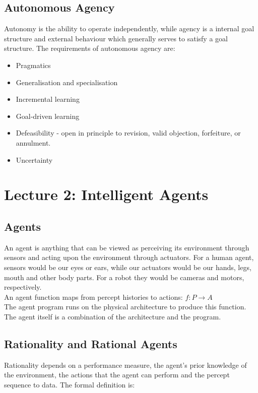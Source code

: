 \documentclass[11pt, oneside]{article}   	%
\begin{document}
\subsection{Autonomous Agency}
Autonomy is the ability to operate independently, while agency is a internal goal structure and external behaviour which generally serves to satisfy a goal structure. The requirements of autonomous agency are:
\begin{itemize}
\item Pragmatics
\item Generalisation and specialisation
\item Incremental learning
\item Goal-driven learning
\item Defeasibility - open in principle to revision, valid objection, forfeiture, or annulment.
\item Uncertainty
\end{itemize}

\section{Lecture 2: Intelligent Agents}

\subsection{Agents}

An agent is anything that can be viewed as perceiving its environment through sensors and acting upon the environment through actuators. For a human agent, sensors would be our eyes or ears, while our actuators would be our hands, legs, mouth and other body parts. For a robot they would be cameras and motors, respectively.
\\
An agent function maps from percept histories to actions: $f: P \rightarrow A$\\
The agent program runs on the physical architecture to produce this function.\\
The agent itself is a combination of the architecture and the program.\\

\subsection{Rationality and Rational Agents}

Rationality depends on a performance measure, the agent's prior knowledge of the environment, the actions that the agent can perform and the percept sequence to data. The formal definition is: 
\end{document}
